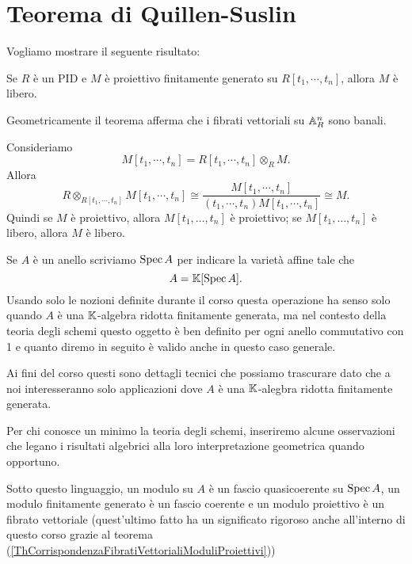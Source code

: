 \chapter{Teorema di Quillen-Suslin}


Vogliamo mostrare il seguente risultato:
\begin{theorem}
Se $R$ \`e un PID e $M$ \`e proiettivo finitamente generato su $R[t_1,\cdots, t_n]$, allora $M$ \`e libero.
\end{theorem}

\begin{remark}
Geometricamente il teorema afferma che i fibrati vettoriali su $\mathbb{A}^n_R$ sono banali.
\end{remark}



\begin{example}
Consideriamo 
\[M[t_1,\cdots,t_n]=R[t_1,\cdots,t_n]\otimes_R M.\]
Allora 
\[R\otimes_{R[t_1,\cdots,t_n]} M[t_1,\cdots,t_n]\cong \frac{M[t_1,\cdots,t_n]}{(t_1,\cdots,t_n)M[t_1,\cdots,t_n]}\cong M.\] 
Quindi se $M$ è proiettivo, allora $M[t_1,\ldots,t_n]$ è proiettivo; se $M[t_1,\ldots,t_n]$ è libero, allora $M$ è libero.
\end{example}

\begin{notation}
Se $A$ \`e un anello scriviamo $\operatorname{Spec} A$ per indicare la variet\`a affine tale che 
\[A=\mathbb{K}[\operatorname{Spec} A].\] 
Usando solo le nozioni definite durante il corso questa operazione ha senso solo quando $A$ \`e una $\mathbb{K}$-algebra ridotta finitamente generata, ma nel contesto della teoria degli schemi questo oggetto \`e ben definito per ogni anello commutativo con 1 e quanto diremo in seguito \`e valido anche in questo caso generale.

Ai fini del corso questi sono dettagli tecnici che possiamo trascurare dato che a noi interesseranno solo applicazioni dove $A$ \`e una $\mathbb{K}$-alegbra ridotta finitamente generata.
\end{notation}

\begin{remark}
Per chi conosce un minimo la teoria degli schemi, inseriremo alcune osservazioni che legano i risultati algebrici alla loro interpretazione geometrica quando opportuno.

Sotto questo linguaggio, un modulo su $A$ \`e un fascio quasicoerente su $\operatorname{Spec} A$, un modulo finitamente generato \`e un fascio coerente e un modulo proiettivo \`e un fibrato vettoriale (quest'ultimo fatto ha un significato rigoroso anche all'interno di questo corso grazie al teorema (\ref{ThCorrispondenzaFibratiVettorialiModuliProiettivi}))
\end{remark}


